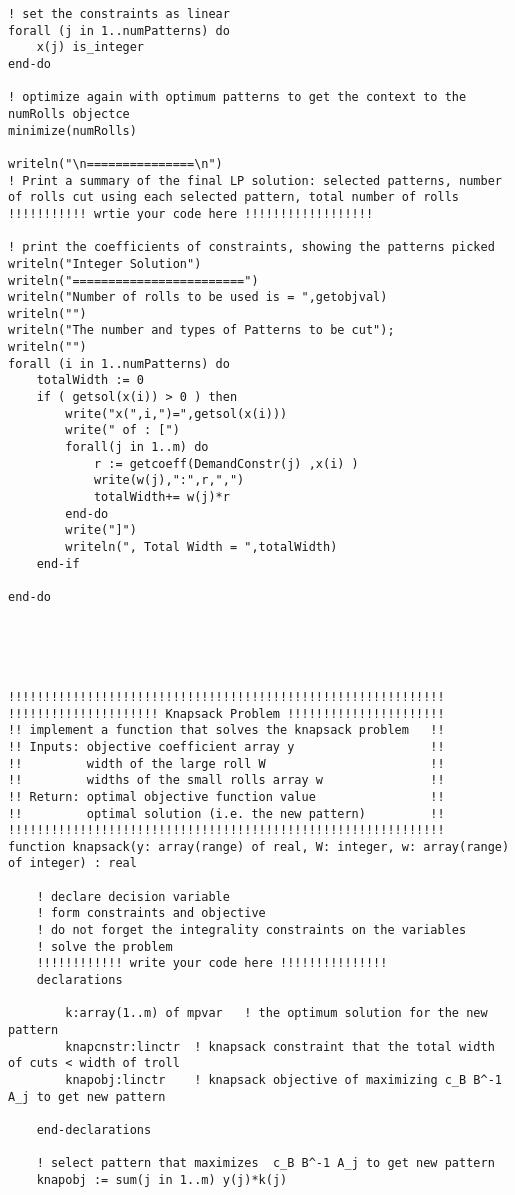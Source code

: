 \documentclass[twoside,12pt]{article}
\begin{document}
\begin{verbatim}
! set the constraints as linear 
forall (j in 1..numPatterns) do
	x(j) is_integer
end-do

! optimize again with optimum patterns to get the context to the numRolls objectce
minimize(numRolls)

writeln("\n===============\n")
! Print a summary of the final LP solution: selected patterns, number of rolls cut using each selected pattern, total number of rolls
!!!!!!!!!!! wrtie your code here !!!!!!!!!!!!!!!!!!

! print the coefficients of constraints, showing the patterns picked
writeln("Integer Solution")
writeln("========================")
writeln("Number of rolls to be used is = ",getobjval)
writeln("")
writeln("The number and types of Patterns to be cut");
writeln("")
forall (i in 1..numPatterns) do	
	totalWidth := 0
	if ( getsol(x(i)) > 0 ) then
		write("x(",i,")=",getsol(x(i)))
		write(" of : [")
		forall(j in 1..m) do
			r := getcoeff(DemandConstr(j) ,x(i) )
			write(w(j),":",r,",")
			totalWidth+= w(j)*r			
		end-do	
		write("]")
		writeln(", Total Width = ",totalWidth)
	end-if
	
end-do


	


!!!!!!!!!!!!!!!!!!!!!!!!!!!!!!!!!!!!!!!!!!!!!!!!!!!!!!!!!!!!!
!!!!!!!!!!!!!!!!!!!!! Knapsack Problem !!!!!!!!!!!!!!!!!!!!!!
!! implement a function that solves the knapsack problem   !!
!! Inputs: objective coefficient array y                   !!   
!!         width of the large roll W                       !!
!!         widths of the small rolls array w               !!
!! Return: optimal objective function value                !!  
!!         optimal solution (i.e. the new pattern)         !!
!!!!!!!!!!!!!!!!!!!!!!!!!!!!!!!!!!!!!!!!!!!!!!!!!!!!!!!!!!!!!
function knapsack(y: array(range) of real, W: integer, w: array(range) of integer) : real

	! declare decision variable
	! form constraints and objective
	! do not forget the integrality constraints on the variables
	! solve the problem
	!!!!!!!!!!!! write your code here !!!!!!!!!!!!!!!
	declarations

		k:array(1..m) of mpvar   ! the optimum solution for the new pattern
		knapcnstr:linctr  ! knapsack constraint that the total width of cuts < width of troll
		knapobj:linctr    ! knapsack objective of maximizing c_B B^-1 A_j to get new pattern
		
	end-declarations

	! select pattern that maximizes  c_B B^-1 A_j to get new pattern
	knapobj := sum(j in 1..m) y(j)*k(j)
		

\end{verbatim}
\end{document}
